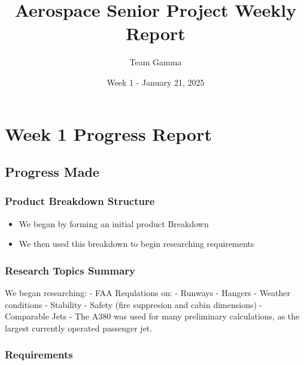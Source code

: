 \documentclass[12pt]{article}
\title{Aerospace Senior Project Weekly Report}
\author{Team Gamma}
\date{Week 1 - January 21, 2025}
\begin{document}
\maketitle

\section{Week 1 Progress Report}\label{week-1-progress-report}

\subsection{Progress Made}\label{progress-made}

\subsubsection{Product Breakdown
Structure}\label{product-breakdown-structure}

\begin{itemize}
\tightlist
\item
  We began by forming an initial product Breakdown
\item
  We then used this breakdown to begin researching requirements
\end{itemize}

\subsubsection{Research Topics Summary}\label{research-topics-summary}

We began researching: - FAA Requlations on: - Runways - Hangers -
Weather conditions - Stability - Safety (fire suppresion and cabin
dimensions) - Comparable Jets - The A380 was used for many preliminary
calculations, as the largest currently operated passenger jet.

\subsubsection{Requirements}\label{requirements}
\end{document}
